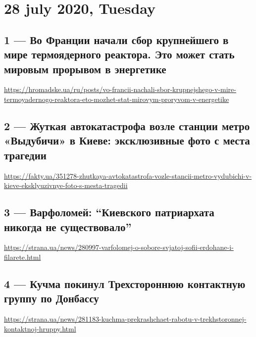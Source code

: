  

\clearpage
\section{28 july 2020, Tuesday}


\subsection{1 --- Во Франции начали сбор крупнейшего в мире термоядерного
реактора. Это может стать мировым прорывом в энергетике}

\url{https://hromadske.ua/ru/posts/vo-francii-nachali-sbor-krupnejshego-v-mire-termoyadernogo-reaktora-eto-mozhet-stat-mirovym-proryvom-v-energetike}

\subsection{2 --- Жуткая автокатастрофа возле станции метро «Выдубичи» в Киеве: эксклюзивные фото с места трагедии}
\url{https://fakty.ua/351278-zhutkaya-avtokatastrofa-vozle-stancii-metro-vydubichi-v-kieve-eksklyuzivnye-foto-s-mesta-tragedii}

\subsection{3 --- Варфоломей: ``Киевского патриархата никогда не существовало''}
\url{https://strana.ua/news/280997-varfolomej-o-sobore-svjatoj-sofii-erdohane-i-filarete.html}

\subsection{4 --- Кучма покинул Трехстороннюю контактную группу по Донбассу}
\url{https://strana.ua/news/281183-kuchma-prekrashchaet-rabotu-v-trekhstoronnej-kontaktnoj-hruppy.html}

